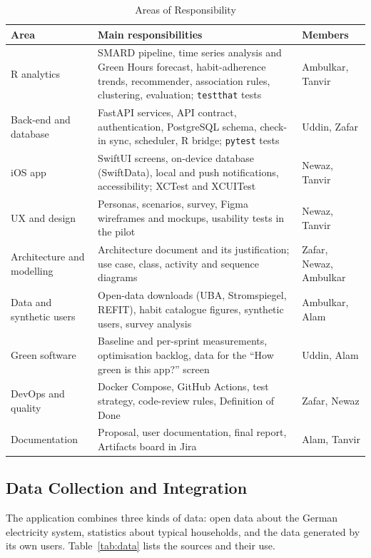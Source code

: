 \documentclass[conference]{IEEEtran}
\newcommand{\pkg}[1]{\texttt{#1}}
\begin{document}
\begin{table}[!t]
\caption{Areas of Responsibility}
\label{tab:resp}
\centering
\footnotesize
\setlength{\tabcolsep}{3pt}
\begin{tabular}{@{}L{1.75cm}L{4.45cm}L{1.9cm}@{}}
\toprule
Area & Main responsibilities & Members \\
\midrule
R analytics & SMARD pipeline, time series analysis and Green Hours forecast, habit-adherence trends, recommender, association rules, clustering, evaluation; \pkg{testthat} tests & Ambulkar, Tanvir \\
Back-end and database & FastAPI services, API contract, authentication, PostgreSQL schema, check-in sync, scheduler, R bridge; \pkg{pytest} tests & Uddin, Zafar \\
iOS app & SwiftUI screens, on-device database (SwiftData), local and push notifications, accessibility; XCTest and XCUITest & Newaz, Tanvir \\
UX and design & Personas, scenarios, survey, Figma wireframes and mockups, usability tests in the pilot & Newaz, Tanvir \\
Architecture and modelling & Architecture document and its justification; use case, class, activity and sequence diagrams & Zafar, Newaz, Ambulkar \\
Data and synthetic users & Open-data downloads (UBA, Stromspiegel, REFIT), habit catalogue figures, synthetic users, survey analysis & Ambulkar, Alam \\
Green software & Baseline and per-sprint measurements, optimisation backlog, data for the ``How green is this app?'' screen & Uddin, Alam \\
DevOps and quality & Docker Compose, GitHub Actions, test strategy, code-review rules, Definition of Done & Zafar, Newaz \\
Documentation & Proposal, user documentation, final report, Artifacts board in Jira & Alam, Tanvir \\
\bottomrule
\end{tabular}
\end{table}

\subsection{Data Collection and Integration}
The application combines three kinds of data: open data about the German electricity system, statistics about typical households, and the data generated by its own users. Table~\ref{tab:data} lists the sources and their use.
\end{document}
